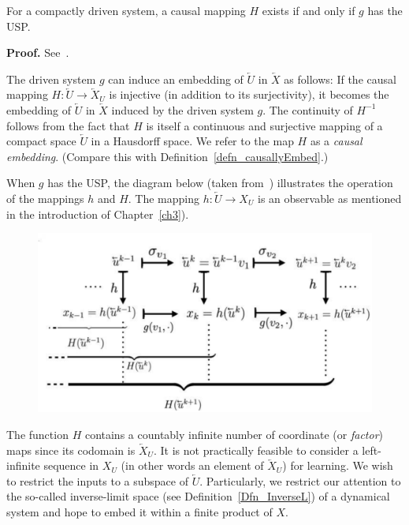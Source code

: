 \begin{Theorem}
  For a compactly driven system, a causal mapping $H$ exists if and only if $g$ has the USP. 
\end{Theorem}
\vspace{-6mm}
{\bf Proof.}  See~\cite[Theorem.3]{manjunath2013echo}.

The driven system $g$ can induce an embedding of $\overleftarrow{U}$ in $\overleftarrow{X}$ as follows: 
If the causal mapping $H:\overleftarrow{U}{\to}{\overleftarrow{X}_U}$ is injective (in addition to its surjectivity), it becomes the embedding of $\overleftarrow{U}$ in $\overleftarrow{X}$ induced by the driven system $g$. 
The continuity of $H^{-1}$ follows from the fact that $H$ is itself a continuous and surjective mapping of a compact space $\overleftarrow{U}$ in a Hausdorff space.
We refer to the map $H$ as a \emph{causal embedding}. (Compare this with Definition~\ref{defn_causallyEmbed}.) 

When $g$ has the USP, the diagram below (taken from~\cite{Manju_Nonlinearity}) illustrates the operation of the mappings $h$ and $H$. 
The mapping $h:\overleftarrow{U}\to{X_U}$ is an observable as mentioned in the introduction of Chapter~\ref{ch3}).  

\begin{figure}[ht]
  \includegraphics[width=0.6\linewidth]{Graphs/_actionofh_H.eps}
  \centering
\label{fig:actionh_H}
\end{figure}

The function $H$ contains a countably infinite number of coordinate (or \textit{factor}) maps since its codomain is $\overleftarrow{X}_U$.  
It is not practically feasible to consider a left-infinite sequence in $X_U$ (in other words an element of  $\overleftarrow{X}_U$) for learning. We wish to restrict the inputs to a subspace of $\overleftarrow{U}$. 
Particularly, we restrict our attention to the  so-called inverse-limit space (see Definition~\ref{Dfn_InverseL}) of a dynamical system and hope to embed it within a finite product of $X$. 

